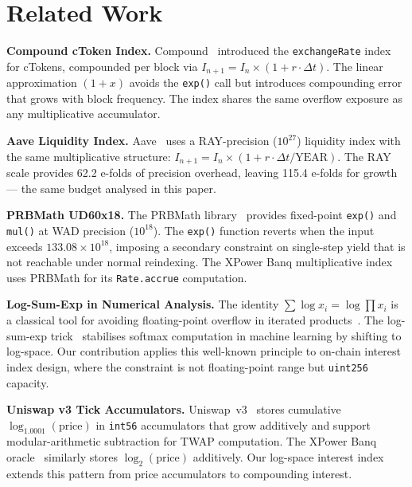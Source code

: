 \documentclass[10pt,a4paper,twocolumn]{article}
\theoremstyle{definition}
\theoremstyle{plain}
\theoremstyle{remark}
\begin{document}
\section{Related Work}
\label{sec:related}

\textbf{Compound cToken Index.} Compound~\cite{compound2019} introduced the \texttt{exchangeRate} index for cTokens, compounded per block via $I_{n+1} = I_n \times (1 + r \cdot \Delta t)$. The linear approximation $(1+x)$ avoids the \texttt{exp()} call but introduces compounding error that grows with block frequency. The index shares the same overflow exposure as any multiplicative accumulator.

\textbf{Aave Liquidity Index.} Aave~\cite{aave2020} uses a RAY-precision ($10^{27}$) liquidity index with the same multiplicative structure: $I_{n+1} = I_n \times (1 + r \cdot \Delta t / \text{YEAR})$. The RAY scale provides 62.2 e-folds of precision overhead, leaving 115.4 e-folds for growth --- the same budget analysed in this paper.

\textbf{PRBMath UD60x18.} The PRBMath library~\cite{prbmath} provides fixed-point \texttt{exp()} and \texttt{mul()} at WAD precision ($10^{18}$). The \texttt{exp()} function reverts when the input exceeds $133.08 \times 10^{18}$, imposing a secondary constraint on single-step yield that is not reachable under normal reindexing. The XPower Banq multiplicative index uses PRBMath for its \texttt{Rate.accrue} computation.

\textbf{Log-Sum-Exp in Numerical Analysis.} The identity $\sum \log x_i = \log \prod x_i$ is a classical tool for avoiding floating-point overflow in iterated products~\cite{higham2002}. The log-sum-exp trick~\cite{blanchard2021} stabilises softmax computation in machine learning by shifting to log-space. Our contribution applies this well-known principle to on-chain interest index design, where the constraint is not floating-point range but \texttt{uint256} capacity.

\textbf{Uniswap v3 Tick Accumulators.} Uniswap~v3~\cite{uniswap2021} stores cumulative $\log_{1.0001}(\text{price})$ in \texttt{int56} accumulators that grow additively and support modular-arithmetic subtraction for TWAP computation. The XPower Banq oracle~\cite{wp} similarly stores $\log_2(\text{price})$ additively. Our log-space interest index extends this pattern from price accumulators to compounding interest.
\end{document}
